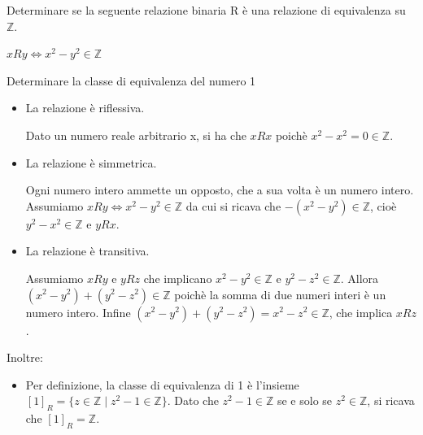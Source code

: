 
\begin{esercizio}
    	Determinare se la seguente relazione binaria R è una relazione di equivalenza su $\mathbb{Z}$.
	
	\begin{center}
		$xRy \Leftrightarrow x^2-y^2 \in \mathbb{Z}$
	\end{center}
	
	Determinare la classe di equivalenza del numero 1
\end{esercizio}

\begin{soluzione}
    \begin{itemize}\setlength\itemsep{1em}
		
		\item La relazione è riflessiva.
		
		Dato un numero reale arbitrario x, si ha che $xRx$ poichè $x^2-x^2 = 0 \in \mathbb{Z}$.
		
		\item La relazione è simmetrica.
		
		Ogni numero intero ammette un opposto, che a sua volta è un numero intero. Assumiamo $xRy \Leftrightarrow x^2-y^2 \in \mathbb{Z}$ da cui si ricava che $-(x^2-y^2)\in \mathbb{Z}$, cioè $y^2-x^2 \in \mathbb{Z}$ e $yRx$. 
		
		\item La relazione è transitiva. 
		
		Assumiamo $xRy$ e $yRz$ che implicano $x^2-y^2 \in \mathbb{Z}$ e $y^2-z^2 \in \mathbb{Z}$. Allora $(x^2-y^2)+(y^2-z^2) \in \mathbb{Z}$ poichè la somma  di due numeri interi è un numero intero. Infine $(x^2-y^2)+(y^2-z^2) = x^2-z^2 \in \mathbb{Z}$, che implica $xRz$.
	\end{itemize}
	
	Inoltre:
	
	\begin{itemize}\setlength\itemsep{1em}
		\item[*] Per definizione, la classe di equivalenza di 1 è l'insieme $[1]_R = \{ z \in \mathbb{Z} \mid  z^2-1 \in \mathbb{Z} \}$. Dato che $z^2-1 \in \mathbb{Z}$ se e solo se $z^2 \in \mathbb{Z}$, si ricava che $[1]_R = \mathbb{Z}$. 
	\end{itemize}
\end{soluzione}



